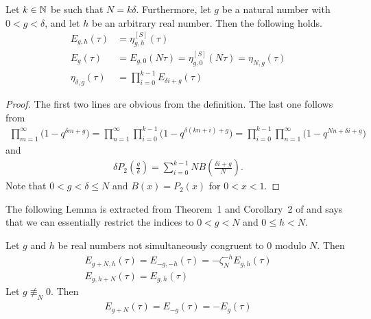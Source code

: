 \documentclass{article}
\begin{document}
\begin{Lemma}
  Let $k\in\mathbb{N}$ be such that $N=k \delta$. Furthermore, let $g$ be a
  natural number with $0 < g < \delta$, and let $h$ be an arbitrary
  real number. Then the following holds.
  \begin{align*}
    E_{g,h}(\tau) &= \eta_{g,h}^{[S]}(\tau)
    \\
    E_g(\tau)
    &=
      E_{g,0}(N \tau)
      =
      \eta_{g,0}^{[S]}(N \tau)
      =
      \eta_{N,g}(\tau)
    \\
    \eta_{\delta,g}(\tau)
    &=
    \prod_{i=0}^{k-1} E_{\delta i + g}(\tau)
  \end{align*}
\end{Lemma}
\begin{proof}
  The first two lines are obvious from the definition.
  The last one follows from
  \begin{gather*}
    \prod_{m=1}^\infty \bigl(1-q^{\delta m + g}\bigr) =
    \prod_{n=1}^\infty \prod_{i=0}^{k-1} \bigl(1-q^{\delta (k n + i) + g}\bigr) =
    \prod_{i=0}^{k-1} \prod_{n=1}^\infty \bigl(1-q^{N n + \delta i + g}\bigr)
  \end{gather*}
  and
  \begin{gather*}
    \delta P_2\left(\frac{g}{\delta}\right)
    =
    \sum_{i=0}^{k-1}N B\left(\frac{\delta i + g}{N}\right).
  \end{gather*}
  Note that $0<g<\delta \le N$ and $B(x)=P_2(x)$ for $0<x<1$.
\end{proof}

The following Lemma is extracted from Theorem~1 and Corollary~2 of
\cite{Yang_GeneralizedDedekindEtaFunctions_2004} and says that we can
essentially restrict the indices to $0<g<N$ and $0\le h<N$.


\begin{Lemma}[Yang]
  \label{thm:modular-Yang-E}
  Let $g$ and $h$ be real numbers not simultaneously congruent to 0
  modulo $N$. Then
  \begin{gather*}
    E_{g+N,h}(\tau) = E_{-g,-h}(\tau) = -\zeta_N^{-h} E_{g,h}(\tau)\\
    E_{g,h+N}(\tau) = E_{g, h}(\tau)
  \end{gather*}
  Let $g \not\equiv_N 0$. Then
  \begin{gather*}
    E_{g+N}(\tau) = E_{-g}(\tau) = - E_g(\tau)
  \end{gather*}
\end{Lemma}
\end{document}
